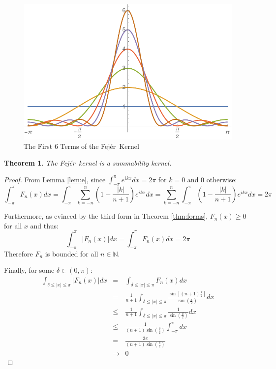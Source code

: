 \documentclass[letterpaper,12pt,fleqn,reqno]{amsart}
\theoremstyle{plain}
\newtheorem{theorem}{Theorem}[section]
\newcommand{\N}{\mathbb{N}}
\renewcommand{\d}{\delta}
\newcommand{\abs}[1]{\left|#1\right|}
\newcommand{\Fej}{Fej\'{e}r\ }
\begin{document}
\begin{figure}[ht]
  \includegraphics{plot}
  \caption{The First 6 Terms of the \Fej Kernel}
  \label{fig:plot}
\end{figure}

\begin{theorem}
  The \Fej kernel is a summability kernel.
\end{theorem}

\begin{proof}
  From Lemma \ref{lem:e}, since $\int_{-\pi}^{\pi}e^{ikx}dx=2\pi$ for $k=0$
  and $0$ otherwise:
  \[\int_{-\pi}^{\pi}F_n(x)dx=
  \int_{-\pi}^{\pi}\sum_{k=-n}^n\left(1-\frac{\abs{k}}{n+1}\right)e^{ikx}dx=
  \sum_{k=-n}^n\int_{-\pi}^{\pi}\left(1-\frac{\abs{k}}{n+1}\right)e^{ikx}dx=
  2\pi\]

  Furthermore, as evinced by the third form in Theorem \ref{thm:forms},
  $F_n(x)\ge0$ for all $x$ and thus:
  \[\int_{-\pi}^{\pi}\abs{F_n(x)}dx=\int_{-\pi}^{\pi}F_n(x)dx=2\pi\]
  Therefore $F_n$ is bounded for all $n\in\N$.

  Finally, for some $\d\in(0,\pi)$:
  \begin{eqnarray*}
    \int_{\d\le\abs{x}\le\pi}\abs{F_n(x)}dx &=&
    \int_{\d\le\abs{x}\le\pi}F_n(x)dx \\
    &=& \frac{1}{n+1}\int_{\d\le\abs{x}\le\pi}
    \frac{\sin[(n+1)\frac{x}{2}]}{\sin(\frac{x}{2})}dx \\
    &\le& \frac{1}{n+1}\int_{\d\le\abs{x}\le\pi}\frac{1}{\sin(\frac{\d}{2})}dx \\
    &\le& \frac{1}{(n+1)\sin(\frac{\d}{2})}\int_{-\pi}^{\pi}dx \\
    &=& \frac{2\pi}{(n+1)\sin(\frac{\d}{2})} \\
    &\to& 0
  \end{eqnarray*}
\end{proof}
\end{document}
